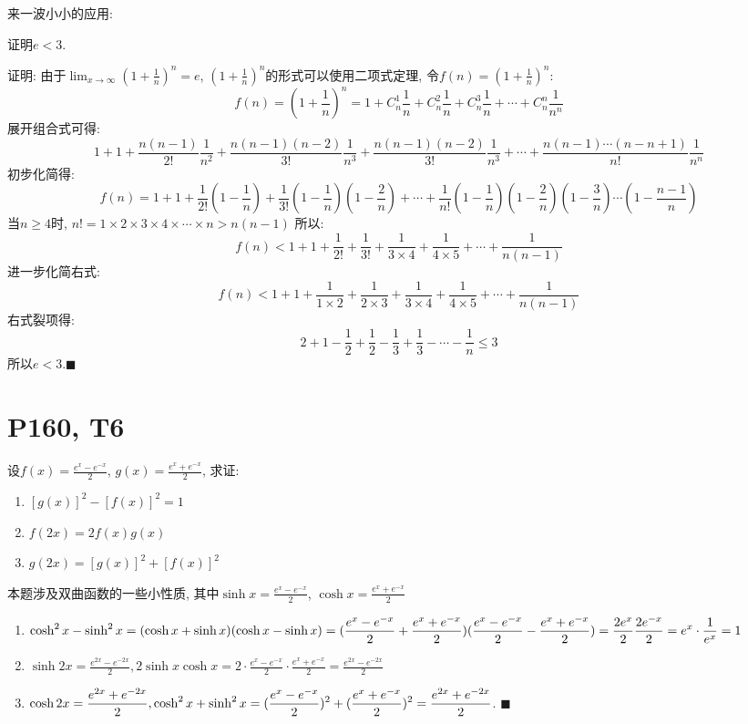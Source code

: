 \documentclass{book}
\begin{document}
    来一波小小的应用:
    \begin{boxB}
        证明$e<3$.
    \end{boxB}
    证明: 由于$\displaystyle \lim_{x \to \infty} (1+\frac{1}{n} )^n=e$, $\displaystyle (1+\frac{1}{n} )^n$的形式可以使用二项式定理, 令$\displaystyle f(n)=(1+\frac{1}{n} )^n$:
    $$
    f(n)=(1+\frac{1}{n})^n=1+C_n^1\frac{1}{n}+C_n^2\frac{1}{n}+C_n^3\frac{1}{n}+\cdots +C_n^n\frac{1}{n^n}
    $$
    展开组合式可得:
    $$
    1+1+\frac{n(n-1)}{2!}\frac{1}{n^2}+\frac{n(n-1)(n-2)}{3!}\frac{1}{n^3}+\frac{n(n-1)(n-2)}{3!}\frac{1}{n^3}+\cdots +\frac{n(n-1)\cdots (n-n+1)}{n!}\frac{1}{n^n}
    $$
    初步化简得:
    $$
    f(n)=1+1+\frac{1}{2!}(1-\frac{1}{n})+\frac{1}{3!}(1-\frac{1}{n})(1-\frac{2}{n})+\cdots +\frac{1}{n!}(1-\frac{1}{n})(1-\frac{2}{n})(1-\frac{3}{n})\cdots (1-\frac{n-1}{n})
    $$
    当$n\ge 4$时, $n!=1\times2\times3\times4\times\cdots \times n>n(n-1)$
    所以: 
    $$
    f(n)<1+1+\frac{1}{2!}+\frac{1}{3!}+\frac{1}{3\times4}+\frac{1}{4\times5}+\cdots +\frac{1}{n(n-1)}
    $$
    进一步化简右式:
    $$
    f(n)<1+1+\frac{1}{1\times2}+\frac{1}{2\times3}+\frac{1}{3\times4}+\frac{1}{4\times5}+\cdots+\frac{1}{n(n-1)}
    $$
    右式裂项得:
    $$
    2+1-\frac{1}{2}+\frac{1}{2}-\frac{1}{3}+\frac{1}{3}-\cdots-\frac{1}{n} \le 3
    $$
    所以$e<3$.$\blacksquare$
    \section{\textcolor[rgb]{0.11,0.65,0.52}{P160, T6}}
    \begin{boxB}
        设$\displaystyle f(x)=\frac{e^x-e^{-x}}{2}$, $\displaystyle g(x)=\frac{e^x+e^{-x}}{2}$, 求证:\par
    \begin{enumerate}
        \item $[g(x)]^2-[f(x)]^2=1$
        \item $f(2x)=2f(x)g(x)$
        \item $g(2x)=[g(x)]^2+[f(x)]^2$
    \end{enumerate}
    \end{boxB}
        本题涉及\textcolor[rgb]{0.38,0.11,0.2}{双曲函数}的一些小性质, 其中$\displaystyle \sinh x = \frac{e^x-e^{-x}}{2}$, $\displaystyle \cosh x = \frac{e^x+e^{-x}}{2}$
    \begin{enumerate}
        \item $\displaystyle \cosh^2 x-\sinh^2x=(\cosh x+\sinh x)(\cosh x-\sinh x)\\=(\frac{e^x-e^{-x}}{2}+\frac{e^x+e^{-x}}{2})(\frac{e^x-e^{-x}}{2}-\frac{e^x+e^{-x}}{2})=\frac{2e^x}{2}\frac{2e^{-x}}{2}=e^x\cdot \frac{1}{e^x}=1$
        \item $\displaystyle \sinh 2x=\frac{e^{2x}-e^{-2x}}{2}, 2\sinh x \cosh x=2\cdot \frac{e^x-e^{-x}}{2}\cdot \frac{e^x+e^{-x}}{2}=\frac{e^{2x}-e^{-2x}}{2}$
        \item $\displaystyle \cosh 2x=\frac{e^{2x}+e^{-2x}}{2}, \cosh^2x+\sinh^2x=(\frac{e^x-e^{-x}}{2})^2+ (\frac{e^x+e^{-x}}{2})^2\\=\frac{e^{2x}+e^{-2x}}{2}$. $\blacksquare$
    \end{enumerate}
\end{document}
